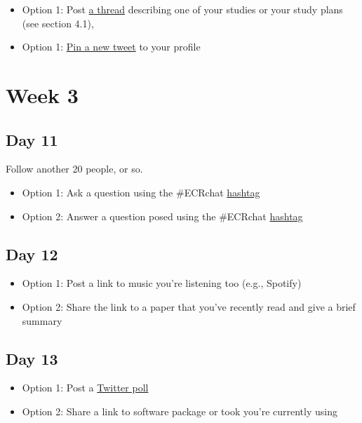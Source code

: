 \documentclass[
]{book}
\providecommand{\tightlist}{%
  \setlength{\itemsep}{0pt}\setlength{\parskip}{0pt}}
\begin{document}
\begin{itemize}
\tightlist
\item
  Option 1: Post \protect\hyperlink{advanced}{a thread} describing one of your studies or your study plans (see section 4.1),
\item
  Option 1: \protect\hyperlink{intermediate}{Pin a new tweet} to your profile
\end{itemize}

\hypertarget{week-3}{%
\section*{Week 3}\label{week-3}}

\hypertarget{day-11}{%
\subsection*{Day 11}\label{day-11}}

Follow another 20 people, or so.

\begin{itemize}
\tightlist
\item
  Option 1: Ask a question using the \#ECRchat \protect\hyperlink{intermediate}{hashtag}
\item
  Option 2: Answer a question posed using the \#ECRchat \protect\hyperlink{intermediate}{hashtag}
\end{itemize}

\hypertarget{day-12}{%
\subsection*{Day 12}\label{day-12}}

\begin{itemize}
\tightlist
\item
  Option 1: Post a link to music you're listening too (e.g., Spotify)
\item
  Option 2: Share the link to a paper that you've recently read and give a brief summary
\end{itemize}

\hypertarget{day-13}{%
\subsection*{Day 13}\label{day-13}}

\begin{itemize}
\tightlist
\item
  Option 1: Post a \protect\hyperlink{intermediate}{Twitter poll}
\item
  Option 2: Share a link to software package or took you're currently using
\end{itemize}
\end{document}
